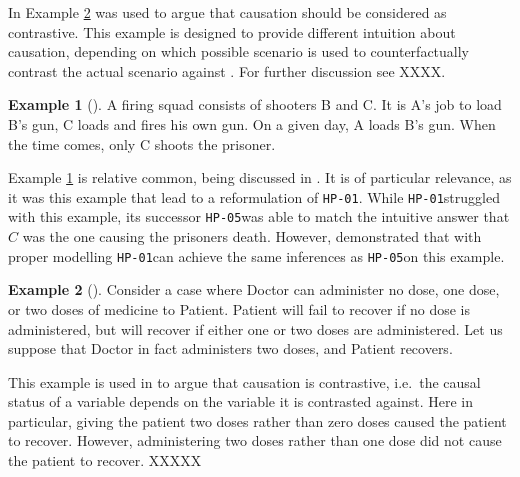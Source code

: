 \documentclass[11pt,a4paper]{book}
\theoremstyle{definition}
\theoremstyle{definition}
\newtheorem{example}{Example}[section]
\theoremstyle{definition}
\theoremstyle{remark}
\newcommand{\hpo}{\texttt{HP-01}}
\newcommand{\hpu}{\texttt{HP-05}}
\begin{document}
In \parencite{blanchard2017cause} Example \ref{ex:contrastive-1} was used to argue that causation should be considered as contrastive. 
This example is designed to provide different intuition about causation, depending on which possible scenario is used to counterfactually contrast the actual scenario against \parencite{blanchard2017cause}.
For further discussion see XXXX.


  
 \begin{example}[\cite{weslake2015partial}]
\label{ex:load-1}
A firing squad consists of shooters B and C. It is A’s job to load B’s gun, C loads and fires his own gun. On a given day, A loads B’s gun. When the time comes, only C shoots the prisoner.
 \end{example}
 
Example \ref{ex:load-1} is relative common, being discussed in \parencite{weslake2015partial,chockler2015causal,halpern2016appropriate,bochman2018actual}.
It is of particular relevance, as it was this example that lead to a reformulation of \hpo. While \hpo struggled with this example, its successor \hpu was able to match the intuitive answer that 
$C$ was the one causing the prisoners death.
However, \parencite{halpern2016appropriate} demonstrated that with proper modelling \hpo can achieve the same inferences as \hpu on this example.


 \begin{example}[\cite{blanchard2017cause}]
\label{ex:contrastive-1}
Consider a case where Doctor can administer no dose, one dose, or two doses of medicine to Patient. Patient will fail to recover if no dose is administered, but will recover if either one or two doses are administered. Let us suppose that Doctor in fact administers two doses, and Patient recovers.
 \end{example}
 
This example is used in \parencite{blanchard2017cause} to argue that causation is contrastive, i.e.\ the causal status of a variable depends on the variable it is contrasted against.
Here in particular, giving the patient two doses rather than zero doses caused the patient to recover. However, administering two doses rather than one dose did not cause the patient to recover.
XXXXX
\end{document}
